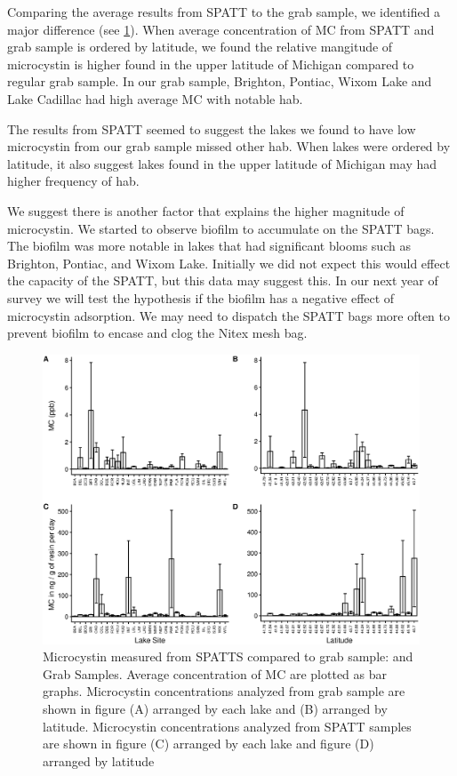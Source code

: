
Comparing the average results from SPATT to the grab sample, we identified a major difference (see \ref{fig:spattbox}). When average concentration of MC from SPATT and grab sample is ordered by latitude, we found the relative mangitude of microcystin is higher found in the upper latitude of Michigan compared to regular grab sample. In our grab sample, Brighton, Pontiac, Wixom Lake and Lake Cadillac had high average MC with notable \gls{hab}.

The results from SPATT seemed to suggest the lakes we found to have low microcystin from our grab sample missed other \gls{hab}. When lakes were ordered by latitude, it also suggest lakes found in the upper latitude of Michigan may had higher frequency of \gls{hab}.

We suggest there is another factor that explains the higher magnitude of microcystin. We started to observe biofilm to accumulate on the SPATT bags. The biofilm was more notable in lakes that had significant blooms such as Brighton, Pontiac, and Wixom Lake. Initially we did not expect this would effect the capacity of the SPATT, but this data may suggest this. In our next year of survey we will test the hypothesis if the biofilm has a negative effect of microcystin adsorption. We may need to dispatch the SPATT bags more often to prevent biofilm to encase and clog the Nitex mesh bag.

\begin{figure}[!hp]
\includegraphics[width=\textwidth]{figures/spatttboxplotlake}
\caption{
Microcystin measured from SPATTS compared to grab sample: and Grab Samples. Average concentration of MC are plotted as bar graphs. Microcystin concentrations analyzed from grab sample are shown in figure (A) arranged by each lake and (B) arranged by latitude. Microcystin concentrations analyzed from SPATT samples are shown in figure (C) arranged by each lake and figure (D) arranged by latitude
}
\label{fig:spattbox}
\end{figure}







